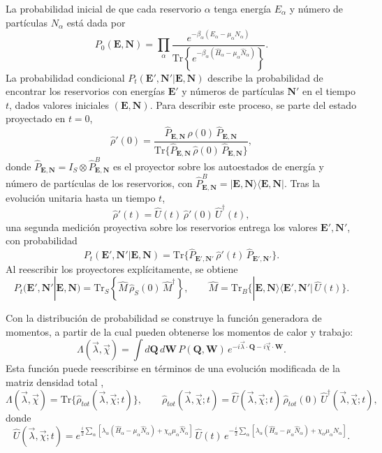 La probabilidad inicial de que cada reservorio $\alpha$ tenga energía $E_{\alpha}$ y número de partículas $N_{\alpha}$ está dada por
\[
P_{0}(\mathbf{E},\mathbf{N}) = 
\prod_{\alpha}  
\frac{e^{-\beta_{\alpha}(E_{\alpha}-\mu_{\alpha}N_{\alpha})}}
{\text{Tr}\left\{e^{-\beta_{\alpha}(\hat{H}_{\alpha}-\mu_{\alpha}\hat{N}_{\alpha})}\right\}}.
\]
La probabilidad condicional $P_{t}(\mathbf{E}',\mathbf{N}'|\mathbf{E},\mathbf{N})$ describe la probabilidad de encontrar los reservorios con energías $\mathbf{E}'$ y números de partículas $\mathbf{N}'$ en el tiempo $t$, dados valores iniciales $(\mathbf{E},\mathbf{N})$. Para describir este proceso, se parte del estado proyectado en $t=0$,
\[
\hat{\rho}'(0) =
\frac{\hat{P}_{\mathbf{E},\mathbf{N}}\,\hat{\rho}(0)\,\hat{P}_{\mathbf{E},\mathbf{N}}}
{\text{Tr}\{\hat{P}_{\mathbf{E},\mathbf{N}}\,\hat{\rho}(0)\,\hat{P}_{\mathbf{E},\mathbf{N}}\}},
\]
donde $\hat{P}_{\mathbf{E},\mathbf{N}} = I_{S}\otimes \hat{P}^{B}_{\mathbf{E},\mathbf{N}}$ es el proyector sobre los autoestados de energía y número de partículas de los reservorios, con 
$\hat{P}^{B}_{\mathbf{E},\mathbf{N}} = |\mathbf{E},\mathbf{N}\rangle\langle \mathbf{E},\mathbf{N}|$. Tras la evolución unitaria hasta un tiempo $t$,
\[
\hat{\rho}'(t) = \hat{U}(t)\,\hat{\rho}'(0)\,\hat{U}^{\dagger}(t),
\]
una segunda medición proyectiva sobre los reservorios entrega los valores $\mathbf{E}',\mathbf{N}'$, con probabilidad
\[
P_{t}(\mathbf{E}',\mathbf{N}'|\mathbf{E},\mathbf{N}) =
\text{Tr}\{\hat{P}_{\mathbf{E}',\mathbf{N}'}\,\hat{\rho}'(t)\,\hat{P}_{\mathbf{E}',\mathbf{N}'}\}.
\]
Al reescribir los proyectores explícitamente, se obtiene
\[
P_{t}(\mathbf{E}',\mathbf{N}'|\mathbf{E},\mathbf{N}) =
\text{Tr}_{S}\!\left\{\hat{M}\,\hat{\rho}_{S}(0)\,\hat{M}^{\dagger}\right\},
\qquad
\hat{M} = \text{Tr}_{B}\{|\mathbf{E},\mathbf{N}\rangle\langle \mathbf{E}',\mathbf{N}'|\,\hat{U}(t)\}.
\]

Con la distribución de probabilidad se construye la función generadora de momentos, a partir de la cual pueden obtenerse los momentos de calor y trabajo:
\begin{equation}
    \Lambda(\vec{\lambda},\vec{\chi}) = 
    \int d\mathbf{Q}\, d\mathbf{W}\,P(\mathbf{Q},\mathbf{W})\,
    e^{-i\vec{\lambda}\cdot \mathbf{Q} -i\vec{\chi}\cdot \mathbf{W}}.
    \label{sec2funciongeneradora}
\end{equation}
Esta función puede reescribirse en términos de una evolución modificada de la matriz densidad total \cite{esposito2009nonequilibrium},
\begin{equation}
    \Lambda(\vec{\lambda},\vec{\chi}) = 
    \text{Tr}\{\hat{\rho}_{tot}(\vec{\lambda},\vec{\chi};t)\}, 
    \qquad 
    \hat{\rho}_{tot}(\vec{\lambda},\vec{\chi};t) 
    = \hat{U}(\vec{\lambda},\vec{\chi};t)\,\hat{\rho}_{tot}(0)\,
    \hat{U}^{\dagger}(\vec{\lambda},\vec{\chi};t),
    \label{sec2:evolucionconteo}
\end{equation}
donde
\[
\hat{U}(\vec{\lambda},\vec{\chi};t) = 
e^{\tfrac{i}{2}\sum_{\alpha}[\lambda_{\alpha}(\hat{H}_{\alpha}-\mu_{\alpha}\hat{N}_{\alpha})
+ \chi_{\alpha}\mu_{\alpha}\hat{N}_{\alpha}]} 
\,\hat{U}(t)\,
e^{-\tfrac{i}{2}\sum_{\alpha}[\lambda_{\alpha}(\hat{H}_{\alpha}-\mu_{\alpha}\hat{N}_{\alpha})
+ \chi_{\alpha}\mu_{\alpha}\hat{N}_{\alpha}]}.
\]

